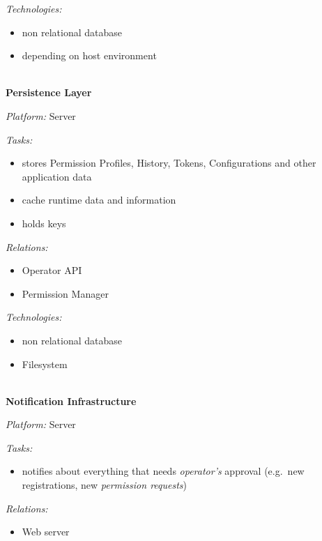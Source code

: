 \documentclass[12pt,english,a4paper,titlepage,cleardoublepage=empty,dottedtoc]{report}
\providecommand{\tightlist}{%
  \setlength{\itemsep}{0pt}\setlength{\parskip}{0pt}}
\begin{document}
\emph{Technologies:}

\begin{itemize}
\tightlist
\item
  non relational database
\item
  depending on host environment
\end{itemize}

~\\
\textbf{Persistence Layer}

\emph{Platform:} Server

\emph{Tasks:}

\begin{itemize}
\tightlist
\item
  stores Permission Profiles, History, Tokens, Configurations and other
  application data
\item
  cache runtime data and information
\item
  holds keys
\end{itemize}

\emph{Relations:}

\begin{itemize}
\tightlist
\item
  Operator API
\item
  Permission Manager
\end{itemize}

\emph{Technologies:}

\begin{itemize}
\tightlist
\item
  non relational database
\item
  Filesystem
\end{itemize}

~\\
\textbf{Notification Infrastructure}

\emph{Platform:} Server

\emph{Tasks:}

\begin{itemize}
\tightlist
\item
  notifies about everything that needs \emph{operator's} approval
  (e.g.~new registrations, new \emph{permission requests})
\end{itemize}

\emph{Relations:}

\begin{itemize}
\tightlist
\item
  Web server
\end{itemize}
\end{document}
